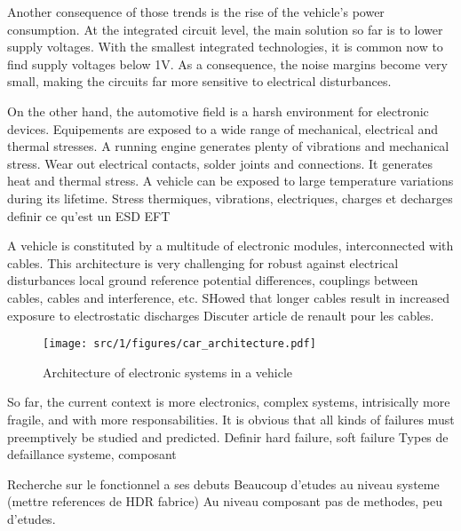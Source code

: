 Another consequence of those trends is the rise of the vehicle's power consumption.
At the integrated circuit level, the main solution so far is to lower supply voltages.
With the smallest integrated technologies, it is common now to find supply voltages below 1V.
As a consequence, the noise margins become very small, making the circuits far more sensitive to electrical disturbances.

On the other hand, the automotive field is a harsh environment for electronic devices.
Equipements are exposed to a wide range of mechanical, electrical and thermal stresses.
A running engine generates plenty of vibrations and mechanical stress.
Wear out electrical contacts, solder joints and connections.
It generates heat and thermal stress.
A vehicle can be exposed to large temperature variations during its lifetime.
Stress thermiques, vibrations, electriques, charges et decharges
definir ce qu'est un ESD EFT

A vehicle is constituted by a multitude of electronic modules, interconnected with cables.
This architecture is very challenging for robust against electrical disturbances
local ground reference potential differences, couplings between cables, cables and interference, etc.
SHowed that longer cables result in increased exposure to electrostatic discharges
Discuter article de renault pour les cables.

\begin{figure}[!h]
  \centering
  \texttt{[image: src/1/figures/car\_architecture.pdf]}
  \caption{Architecture of electronic systems in a vehicle}
  \label{fig:car-architecture}
\end{figure}

So far, the current context is more electronics, complex systems, intrisically more fragile, and with more responsabilities.
It is obvious that all kinds of failures must preemptively be studied and predicted.
Definir hard failure, soft failure
Types de defaillance systeme, composant


Recherche sur le fonctionnel a ses debuts
Beaucoup d'etudes au niveau systeme (mettre references de HDR fabrice)
Au niveau composant pas de methodes, peu d'etudes.

